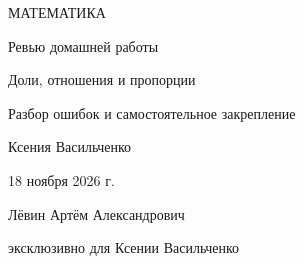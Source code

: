 \documentclass[a4paper,11pt]{article}
\begin{document}
\color{ink}
\thispagestyle{empty}
\begin{center}
\vspace*{29mm}
{\small\color{deepaccent}МАТЕМАТИКА}\par
\vspace{19mm}
{\LARGE Ревью домашней работы}\par
\vspace{16mm}
{\Large\color{accent}Доли, отношения и пропорции}\par
\vspace{12mm}
{\normalsize Разбор ошибок и самостоятельное закрепление}\par
\vfill
{\large Ксения Васильченко}\par
\vspace{8mm}
{18 ноября 2026 г.}\par
\vspace{17mm}
{\small Лёвин Артём Александрович}\par
{\small эксклюзивно для Ксении Васильченко}\par
\vspace{19mm}
\end{center}
\clearpage
\end{document}

